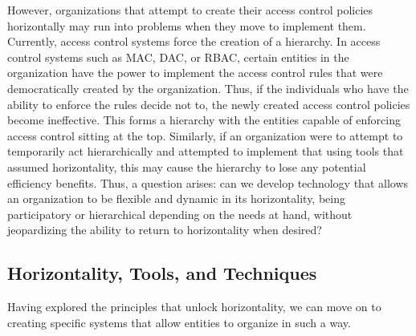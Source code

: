 However, organizations that attempt to create their access control policies
horizontally may run into problems when they move to implement them. Currently,
access control systems force the creation of a hierarchy. In access control
systems such as MAC, DAC, or RBAC, certain entities in the organization have the
power to implement the access control rules that were democratically created by
the organization. Thus, if the individuals who have the ability to enforce the
rules decide not to, the newly created access control policies become
ineffective. This forms a hierarchy with the entities capable of enforcing
access control sitting at the top. Similarly, if an organization were to attempt
to temporarily act hierarchically and attempted to implement that using tools
that assumed horizontality, this may cause the hierarchy to lose any potential
efficiency benefits. Thus, a question arises: can we develop technology that
allows an organization to be flexible and dynamic in its horizontality, being
participatory or hierarchical depending on the needs at hand, without
jeopardizing the ability to return to horizontality when desired?

\subsection{Horizontality, Tools, and Techniques}
Having explored the principles that unlock horizontality, we can move on to
creating specific systems that allow entities to organize in such a way.


